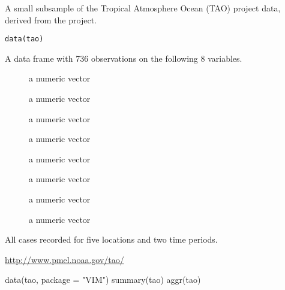 %
\begin{Description}\relax
A small subsample of the Tropical Atmosphere Ocean (TAO) project data, 
derived from the  project.
\end{Description}
%
\begin{Usage}
\begin{verbatim}
data(tao)
\end{verbatim}
\end{Usage}
%
\begin{Format}
A data frame with 736 observations on the following 8 variables.
\begin{description}

\item[] a numeric vector
\item[] a numeric vector
\item[] a numeric vector
\item[] a numeric vector
\item[] a numeric vector
\item[] a numeric vector
\item[] a numeric vector
\item[] a numeric vector

\end{description}

\end{Format}
%
\begin{Details}\relax
All cases recorded for five locations and two time periods.
\end{Details}
%
\begin{Source}\relax
\url{http://www.pmel.noaa.gov/tao/}
\end{Source}
%
\begin{Examples}
\begin{ExampleCode}
data(tao, package = "VIM")
summary(tao)
aggr(tao)
\end{ExampleCode}
\end{Examples}
